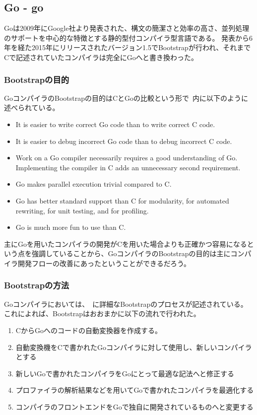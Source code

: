 \subsection{Go - go}
\label{side-effect:instance:go}

Goは2009年にGoogle社より発表された、構文の簡潔さと効率の高さ、並列処理のサポートを中心的な特徴とする静的型付コンパイラ型言語である。
発表から6年を経た2015年にリリースされたバージョン1.5でBootstrapが行われ、それまでCで記述されていたコンパイラは完全にGoへと書き換わった。~\cite{go}

\subsubsection{Bootstrapの目的}

GoコンパイラのBootstrapの目的はCとGoの比較という形で~\cite{go-compiler-overhaul}内に以下のように述べられている。

\begin{itemize}
\item It is easier to write correct Go code than to write correct C code.
\item It is easier to debug incorrect Go code than to debug incorrect C code.
\item Work on a Go compiler necessarily requires a good understanding of Go. Implementing the compiler in C adds an unnecessary second requirement.
\item Go makes parallel execution trivial compared to C.
\item Go has better standard support than C for modularity, for automated rewriting, for unit testing, and for profiling.
\item Go is much more fun to use than C.
\end{itemize}

主にGoを用いたコンパイラの開発がCを用いた場合よりも正確かつ容易になるという点を強調していることから、GoコンパイラのBootstrapの目的は主にコンパイラ開発フローの改善にあったということができるだろう。

\subsubsection{Bootstrapの方法}

Goコンパイラにおいては、~\cite{go-compiler-overhaul}に詳細なBootstrapのプロセスが記述されている。
これによれば、Bootstrapはおおまかに以下の流れで行われた。

\begin{enumerate}
\item CからGoへのコードの自動変換器を作成する。
\item 自動変換機をCで書かれたGoコンパイラに対して使用し、新しいコンパイラとする
\item 新しいGoで書かれたコンパイラをGoにとって最適な記法へと修正する
\item プロファイラの解析結果などを用いてGoで書かれたコンパイラを最適化する
\item コンパイラのフロントエンドをGoで独自に開発されているものへと変更する
\end{enumerate}


